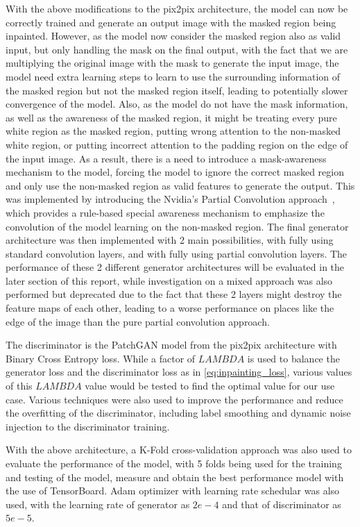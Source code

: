 \documentclass[10pt,twocolumn,letterpaper]{article}
\begin{document}
With the above modifications to the pix2pix architecture, the model can now be correctly trained and generate an output image with the masked region being inpainted. However, as the model now 
consider the masked region also as valid input, but only handling the mask on the final output, with the fact that we are multiplying the original image with the mask to generate the input image, 
the model need extra learning steps to learn to use the surrounding information of the masked region but not the masked region itself, leading to potentially slower convergence of the model. Also,
as the model do not have the mask information, as well as the awareness of the masked region, it might be treating every pure white region as the masked region, putting wrong attention to the 
non-masked white region, or putting incorrect attention to the padding region on the edge of the input image. As a result, there is a need to introduce a mask-awareness mechanism to the 
model, forcing the model to ignore the correct masked region and only use the non-masked region as valid features to generate the output. This was implemented by introducing the Nvidia's 
Partial Convolution approach~\cite{Liu2018}, which provides a rule-based special awareness mechanism to emphasize the convolution of the model learning on the non-masked region. The final 
generator architecture was then implemented with 2 main possibilities, with fully using standard convolution layers, and with fully using partial convolution layers. The performance of these 2 
different generator architectures will be evaluated in the later section of this report, while investigation on a mixed approach was also performed but deprecated due to the fact that these 2 layers 
might destroy the feature maps of each other, leading to a worse performance on places like the edge of the image than the pure partial convolution approach.

The discriminator is the PatchGAN model from the pix2pix architecture with Binary Cross Entropy loss. While a factor of $LAMBDA$ is used to balance the generator loss and the discriminator loss as in 
\cref{eq:inpainting_loss}, various values of this $LAMBDA$ value would be tested to find the optimal value for our use case. Various techniques were also used to improve the performance and reduce the 
overfitting of the discriminator, including label smoothing \cite{Muller2019} and dynamic noise injection \cite{Feng2021} to the discriminator training.

With the above architecture, a K-Fold cross-validation approach was also used to evaluate the performance of the model, with 5 folds being used for the training and testing of the model, measure and 
obtain the best performance model with the use of TensorBoard. Adam optimizer with learning rate schedular was also used, with the learning rate of generator as $2e-4$ and that of discriminator as $5e-5$.
\end{document}
